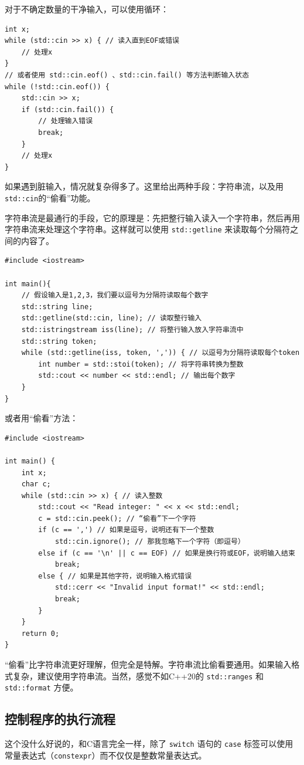 对于不确定数量的干净输入，可以使用循环：
\begin{verbatim}
int x;
while (std::cin >> x) { // 读入直到EOF或错误
    // 处理x
}
// 或者使用 std::cin.eof() 、std::cin.fail() 等方法判断输入状态
while (!std::cin.eof()) {
    std::cin >> x;
    if (std::cin.fail()) {
        // 处理输入错误
        break;
    }
    // 处理x
}
\end{verbatim}

如果遇到脏输入，情况就复杂得多了。这里给出两种手段：字符串流，以及用\verb|std::cin|的“偷看”功能。

字符串流是最通行的手段，它的原理是：先把整行输入读入一个字符串，然后再用字符串流来处理这个字符串。这样就可以使用 \verb|std::getline| 来读取每个分隔符之间的内容了。
\begin{verbatim}
#include <iostream>

int main(){
    // 假设输入是1,2,3，我们要以逗号为分隔符读取每个数字
    std::string line;
    std::getline(std::cin, line); // 读取整行输入
    std::istringstream iss(line); // 将整行输入放入字符串流中
    std::string token;
    while (std::getline(iss, token, ',')) { // 以逗号为分隔符读取每个token
        int number = std::stoi(token); // 将字符串转换为整数
        std::cout << number << std::endl; // 输出每个数字
    }
}
\end{verbatim}

或者用“偷看”方法：
\begin{verbatim}
#include <iostream>

int main() {
    int x;
    char c;
    while (std::cin >> x) { // 读入整数
        std::cout << "Read integer: " << x << std::endl;
        c = std::cin.peek(); // “偷看”下一个字符
        if (c == ',') // 如果是逗号，说明还有下一个整数
            std::cin.ignore(); // 那我忽略下一个字符（即逗号）
        else if (c == '\n' || c == EOF) // 如果是换行符或EOF，说明输入结束
            break;
        else { // 如果是其他字符，说明输入格式错误
            std::cerr << "Invalid input format!" << std::endl;
            break;
        }
    }
    return 0;
}
\end{verbatim}
“偷看”比字符串流更好理解，但完全是特解。字符串流比偷看要通用。如果输入格式复杂，建议使用字符串流。当然，感觉不如C++20的 \verb|std::ranges| 和 \verb|std::format| 方便。

\subsection{控制程序的执行流程}

这个没什么好说的，和C语言完全一样，除了 \verb|switch| 语句的 \verb|case| 标签可以使用常量表达式（\verb|constexpr|）而不仅仅是整数常量表达式。

